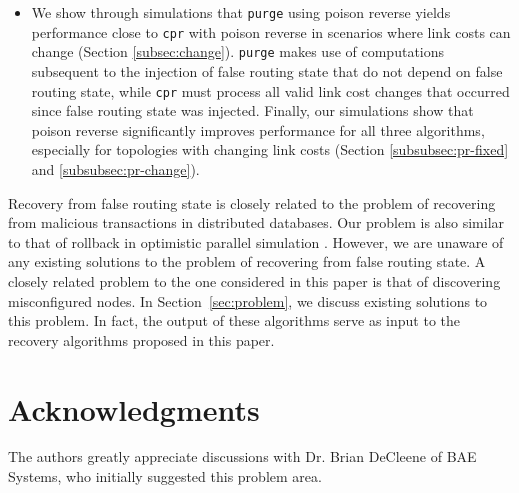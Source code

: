 \documentclass[10pt,conference]{IEEEtran}
\newcommand{\purge}{{{\tt purge} }}
\newcommand{\cpr}{{\tt cpr} }
\begin{document}
\begin{itemize}
\item We show through simulations that \purge using poison reverse yields performance close to \cpr with poison reverse in scenarios where link costs can change
(Section \ref{subsec:change}). \purge makes use of computations subsequent to the injection of false routing state that do not depend on false routing state, while \cpr 
must process all valid link cost changes that occurred since false routing state was injected.  Finally, our simulations show that poison reverse significantly improves 
performance for all three algorithms, especially for topologies with changing link costs (Section \ref{subsubsec:pr-fixed} and \ref{subsubsec:pr-change}). %

\end{itemize}

Recovery from false routing state is closely related to the problem of
recovering from malicious transactions \cite{Liu98,Liu00} in
distributed databases. Our problem is also similar to that of rollback
in optimistic parallel simulation \cite{Jeff}. However, we are unaware
of any existing solutions to the problem of recovering from false
routing state. A closely related problem to the one considered in this
paper is that of discovering misconfigured nodes. In
Section~\ref{sec:problem}, we discuss existing solutions to this
problem. In fact, the output of these algorithms serve as input to the
recovery algorithms proposed in this paper.











%














\section{Acknowledgments}
The authors greatly appreciate discussions with Dr. Brian DeCleene of BAE Systems, who initially suggested this problem area.






%
\end{document}
